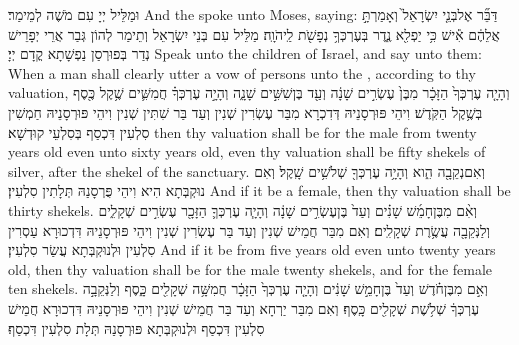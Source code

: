 {וּמַלֵּיל יְיָ עִם מֹשֶׁה לְמֵימַר׃}
{And the \lord\space spoke unto Moses, saying:}{}
{דַּבֵּ֞ר אֶל\maqqaf בְּנֵ֤י יִשְׂרָאֵל֙ וְאָמַרְתָּ֣ אֲלֵהֶ֔ם אִ֕ישׁ כִּ֥י יַפְלִ֖א נֶ֑דֶר בְּעֶרְכְּךָ֥ נְפָשֹׁ֖ת לַֽיהֹוָֽה׃}
{מַלֵּיל עִם בְּנֵי יִשְׂרָאֵל וְתֵימַר לְהוֹן גְּבַר אֲרֵי יְפָרֵישׁ נְדַר בְּפוּרְסַן נַפְשָׁתָא קֳדָם יְיָ׃}
{Speak unto the children of Israel, and say unto them: When a man shall clearly utter a vow of persons unto the \lord, according to thy valuation,}{}
{וְהָיָ֤ה עֶרְכְּךָ֙ הַזָּכָ֔ר מִבֶּן֙ עֶשְׂרִ֣ים שָׁנָ֔ה וְעַ֖ד בֶּן\maqqaf שִׁשִּׁ֣ים שָׁנָ֑ה וְהָיָ֣ה עֶרְכְּךָ֗ חֲמִשִּׁ֛ים שֶׁ֥קֶל כֶּ֖סֶף בְּשֶׁ֥קֶל הַקֹּֽדֶשׁ׃}
{וִיהֵי פּוּרְסָנֵיהּ דְּדִכְרָא מִבַּר עֶשְׂרִין שְׁנִין וְעַד בַּר שִׁתִּין שְׁנִין וִיהֵי פּוּרְסָנֵיהּ חַמְשִׁין סִלְעִין דִּכְסַף בְּסִלְעֵי קוּדְשָׁא׃}
{then thy valuation shall be for the male from twenty years old even unto sixty years old, even thy valuation shall be fifty shekels of silver, after the shekel of the sanctuary.}{}
{וְאִם\maqqaf נְקֵבָ֖ה הִ֑וא וְהָיָ֥ה עֶרְכְּךָ֖ שְׁלֹשִׁ֥ים שָֽׁקֶל׃}
{וְאִם נוּקְבְּתָא הִיא וִיהֵי פֻּרְסָנַהּ תְּלָתִין סִלְעִין׃}
{And if it be a female, then thy valuation shall be thirty shekels.}{}
{וְאִ֨ם מִבֶּן\maqqaf חָמֵ֜שׁ שָׁנִ֗ים וְעַד֙ בֶּן\maqqaf עֶשְׂרִ֣ים שָׁנָ֔ה וְהָיָ֧ה עֶרְכְּךָ֛ הַזָּכָ֖ר עֶשְׂרִ֣ים שְׁקָלִ֑ים וְלַנְּקֵבָ֖ה עֲשֶׂ֥רֶת שְׁקָלִֽים׃}
{וְאִם מִבַּר חֲמֵישׁ שְׁנִין וְעַד בַּר עֶשְׂרִין שְׁנִין וִיהֵי פּוּרְסָנֵיהּ דִּדְכוּרָא עַסְרִין סִלְעִין וּלְנוּקְבְּתָא עֲשַׂר סִלְעִין׃}
{And if it be from five years old even unto twenty years old, then thy valuation shall be for the male twenty shekels, and for the female ten shekels.}{}
{וְאִ֣ם מִבֶּן\maqqaf חֹ֗דֶשׁ וְעַד֙ בֶּן\maqqaf חָמֵ֣שׁ שָׁנִ֔ים וְהָיָ֤ה עֶרְכְּךָ֙ הַזָּכָ֔ר חֲמִשָּׁ֥ה שְׁקָלִ֖ים כָּ֑סֶף וְלַנְּקֵבָ֣ה עֶרְכְּךָ֔ שְׁלֹ֥שֶׁת שְׁקָלִ֖ים כָּֽסֶף׃}
{וְאִם מִבַּר יַרְחָא וְעַד בַּר חֲמֵישׁ שְׁנִין וִיהֵי פּוּרְסָנֵיהּ דִּדְכוּרָא חֲמֵישׁ סִלְעִין דִּכְסַף וּלְנוּקְבְּתָא פּוּרְסָנַהּ תְּלָת סִלְעִין דִּכְסַף׃}

